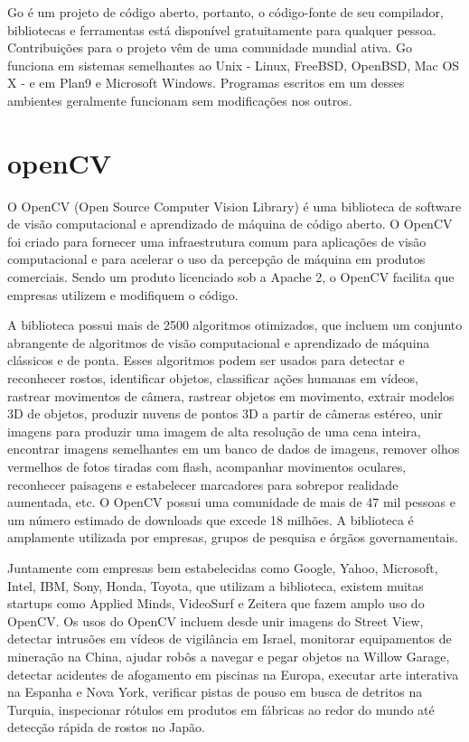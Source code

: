 \documentclass[12pt, %
openright, 
oneside, %
a4paper,    %
brazil]{facom-ufu-abntex2}
\begin{document}
Go é um projeto de código aberto, portanto, o código-fonte de seu compilador,
bibliotecas e ferramentas está disponível gratuitamente para qualquer pessoa.
Contribuições para o projeto vêm de uma comunidade mundial ativa. Go funciona
em sistemas semelhantes ao Unix - Linux, FreeBSD, OpenBSD, Mac OS X - e em
Plan9 e Microsoft Windows. Programas escritos em um desses ambientes geralmente
funcionam sem modificações nos outros. \cite{donovan2015go}

\section{openCV}

O OpenCV (Open Source Computer Vision Library) é uma biblioteca de software de
visão computacional e aprendizado de máquina de código aberto. O OpenCV foi
criado para fornecer uma infraestrutura comum para aplicações de visão
computacional e para acelerar o uso da percepção de máquina em produtos
comerciais. Sendo um produto licenciado sob a Apache 2, o OpenCV facilita que
empresas utilizem e modifiquem o código.

A biblioteca possui mais de 2500 algoritmos otimizados, que incluem um conjunto
abrangente de algoritmos de visão computacional e aprendizado de máquina
clássicos e de ponta. Esses algoritmos podem ser usados para detectar e
reconhecer rostos, identificar objetos, classificar ações humanas em vídeos,
rastrear movimentos de câmera, rastrear objetos em movimento, extrair modelos
3D de objetos, produzir nuvens de pontos 3D a partir de câmeras estéreo, unir
imagens para produzir uma imagem de alta resolução de uma cena inteira,
encontrar imagens semelhantes em um banco de dados de imagens, remover olhos
vermelhos de fotos tiradas com flash, acompanhar movimentos oculares,
reconhecer paisagens e estabelecer marcadores para sobrepor realidade
aumentada, etc. O OpenCV possui uma comunidade de mais de 47 mil pessoas e um
número estimado de downloads que excede 18 milhões. A biblioteca é amplamente
utilizada por empresas, grupos de pesquisa e órgãos governamentais.

Juntamente com empresas bem estabelecidas como Google, Yahoo, Microsoft, Intel,
IBM, Sony, Honda, Toyota, que utilizam a biblioteca, existem muitas startups
como Applied Minds, VideoSurf e Zeitera que fazem amplo uso do OpenCV. Os usos
do OpenCV incluem desde unir imagens do Street View, detectar intrusões em
vídeos de vigilância em Israel, monitorar equipamentos de mineração na China,
ajudar robôs a navegar e pegar objetos na Willow Garage, detectar acidentes de
afogamento em piscinas na Europa, executar arte interativa na Espanha e Nova
York, verificar pistas de pouso em busca de detritos na Turquia, inspecionar
rótulos em produtos em fábricas ao redor do mundo até detecção rápida de rostos
no Japão.
\end{document}
